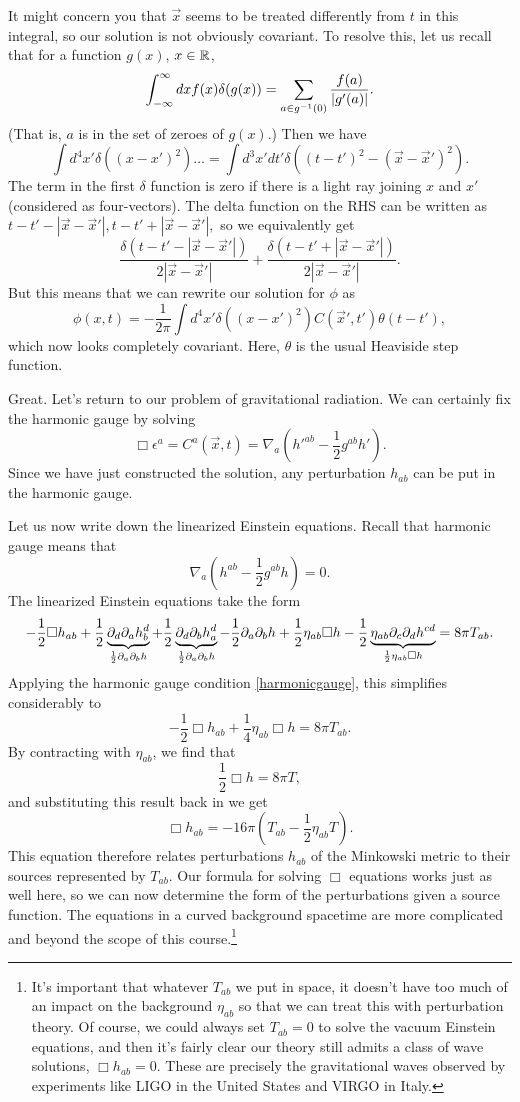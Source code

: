 It might concern you that $\vec x$ seems to be treated differently from $t$ in this integral, so our solution is not obviously covariant. To resolve this, let us recall that for a function $g(x)$, $x\in\mathbb{R}$,
$$\int_{-\infty}^\infty dx f(x)\delta(g(x))=\sum_{a\in g^{-1}(0)}\frac{f(a)}{|g'(a)|}.$$
(That is, $a$ is in the set of zeroes of $g(x)$.) Then we have
$$\int d^4 x'\delta((x-x')^2) \ldots = \int d^3 x' dt' \delta((t-t')^2-(\vec x-\vec x')^2).$$
The term in the first $\delta$ function is zero if there is a light ray joining $x$ and $x'$ (considered as four-vectors). The delta function on the RHS can be written as $t-t'-|\vec x-\vec x'|, t-t'+|\vec x-\vec x'|,$ so we equivalently get
$$\frac{\delta(t-t'-|\vec x-\vec x'|)}{2|\vec x-\vec x'|}+\frac{\delta(t-t'+|\vec x-\vec x'|)}{2|\vec x-\vec x'|}.$$
But this means that we can rewrite our solution for $\phi$ as
$$\phi(x,t)=-\frac{1}{2\pi}\int d^4 x' \delta((x-x')^2)C(\vec x',t')\theta(t-t'),$$
which now looks completely covariant. Here, $\theta$ is the usual Heaviside step function.

Great. Let's return to our problem of gravitational radiation. We can certainly fix the harmonic gauge by solving
$$\Box \epsilon^a=C^a(\vec x,t)=\nabla_a({h'}^{ab}-\frac{1}{2}g^{ab}h').$$
Since we have just constructed the solution, any perturbation $h_{ab}$ can be put in the harmonic gauge.

Let us now write down the linearized Einstein equations. Recall that harmonic gauge means that
\begin{equation}
\nabla_a(h^{ab}-\frac{1}{2}g^{ab}h)=0.\label{harmonicgauge}
\end{equation}
The linearized Einstein equations take the form
$$-\frac{1}{2}\Box h_{ab}+\frac{1}{2}\underbrace{\partial_d \partial_a h^d_b}_{\frac{1}{2} \partial_a \partial_b h} +\frac{1}{2}\underbrace{\partial_d \partial_b h^d_a}_{\frac{1}{2} \partial_a \partial_b h} -\frac{1}{2}\partial_a \partial_b h + \frac{1}{2}\eta_{ab}\Box h -\frac{1}{2}\underbrace{\eta_{ab}\partial_c \partial_d h^{cd}}_{\frac{1}{2}\eta_{ab}\Box h}=8\pi T_{ab}.$$
Applying the harmonic gauge condition \ref{harmonicgauge}, this simplifies considerably to
$$-\frac{1}{2}\Box h_{ab}+\frac{1}{4}\eta_{ab}\Box h=8\pi T_{ab}.$$
By contracting with $\eta_{ab}$, we find that
$$\frac{1}{2}\Box h=8\pi T,$$ and substituting this result back in we get
$$\Box h_{ab}=-16\pi\left(T_{ab}-\frac{1}{2}\eta_{ab}T\right).$$
This equation therefore relates perturbations $h_{ab}$ of the Minkowski metric to their sources represented by $T_{ab}$. Our formula for solving $\Box$ equations works just as well here, so we can now determine the form of the perturbations given a source function. The equations in a curved background spacetime are more complicated and beyond the scope of this course.\footnote{It's important that whatever $T_{ab}$ we put in space, it doesn't have too much of an impact on the background $\eta_{ab}$ so that we can treat this with perturbation theory. Of course, we could always set $T_{ab}=0$ to solve the vacuum Einstein equations, and then it's fairly clear our theory still admits a class of wave solutions, $\Box h_{ab}=0$. These are precisely the gravitational waves observed by experiments like LIGO in the United States and VIRGO in Italy.}